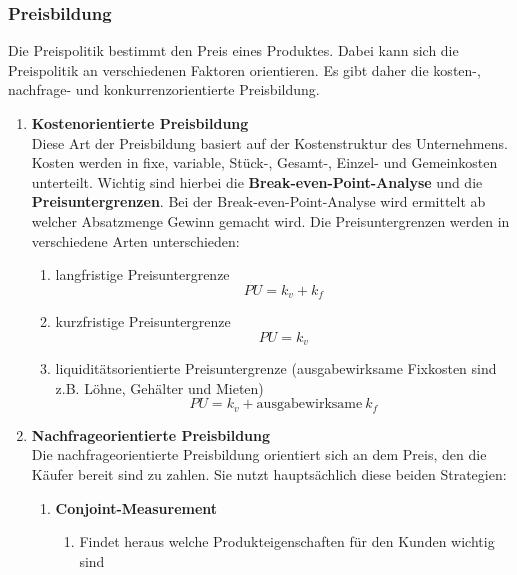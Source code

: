 \subsubsection{Preisbildung}
\begin{flushleft}
    Die Preispolitik bestimmt den Preis eines Produktes.
    Dabei kann sich die Preispolitik an verschiedenen Faktoren orientieren.
    Es gibt daher die kosten-, nachfrage- und konkurrenzorientierte Preisbildung.
    \begin{enumerate}
        \item {
            \textbf{Kostenorientierte Preisbildung} \\
            Diese Art der Preisbildung basiert auf der Kostenstruktur des Unternehmens.
            Kosten werden in fixe, variable, Stück-, Gesamt-, Einzel- und Gemeinkosten unterteilt.
            Wichtig sind hierbei die \textbf{Break-even-Point-Analyse} und die \textbf{Preisuntergrenzen}.
            Bei der Break-even-Point-Analyse wird ermittelt ab welcher Absatzmenge Gewinn gemacht wird.
            Die Preisuntergrenzen werden in verschiedene Arten unterschieden:
            \begin{enumerate}
                \item {
                    langfristige Preisuntergrenze
                    \[PU=k_v+k_f\]
                }
                \item {
                    kurzfristige Preisuntergrenze
                    \[PU=k_v\]
                }
                \item {
                    liquiditätsorientierte Preisuntergrenze (ausgabewirksame Fixkosten sind z.B. Löhne, Gehälter und Mieten)
                    \[PU=k_v+\text{ausgabewirksame}~k_f\]
                }
            \end{enumerate}
        }
        \item {
            \textbf{Nachfrageorientierte Preisbildung} \\
            Die nachfrageorientierte Preisbildung orientiert sich an dem Preis, den die Käufer bereit sind zu zahlen.
            Sie nutzt hauptsächlich diese beiden Strategien:
            \begin{enumerate}
                \item {
                    \textbf{Conjoint-Measurement} \\
                    \begin{enumerate}
                        \item Findet heraus welche Produkteigenschaften für den Kunden wichtig sind

\end{enumerate}}
\end{enumerate}}
\end{enumerate}
\end{flushleft}
